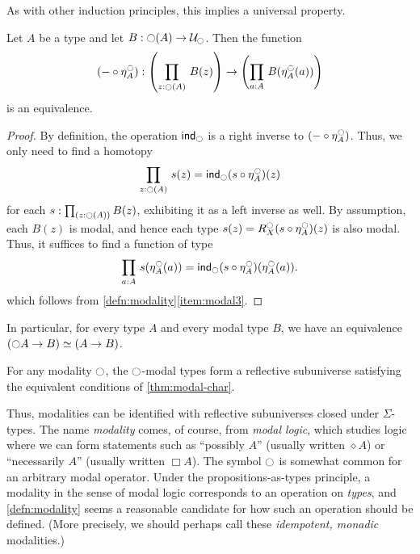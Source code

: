 As with other induction principles, this implies a universal property.

\begin{thm}\label{prop:lv_n_deptype_sec_equiv_by_precomp}
Let $A$ be a type and let $B:\ocircle(A)\to\mathcal{U}_{\ocircle}$. Then the function
\begin{equation*}
(-\circ \mreturn^\modal_A) : \left(\prd{z:\modal(A)}B(z)\right) \to \left(\prd{a:A}B(\mreturn^\modal_A(a))\right)
\end{equation*}
is an equivalence.
\end{thm}
\begin{proof}
By definition, the operation $\mathsf{ind}_{\ocircle}$ is a right inverse to $(-\circ \eta^{\ocircle}_A)$.
Thus, we only need to find a homotopy
\begin{equation*}
\prd{z:\modal(A)}s(z)= \ind{\modal}(s\circ \mreturn^\modal_A)(z)
\end{equation*}
for each $s:\prd{z:\modal(A)}B(z)$, exhibiting it as a left inverse as well.
By assumption, each $B(z)$ is modal, and hence each type $s(z)= R^{\ocircle}_X(s\circ \eta^{\ocircle}_A)(z)$
is also modal.
Thus, it suffices to find a function of type
\begin{equation*}
\prd{a:A}s(\mreturn^\modal_A(a))= \ind{\modal}(s\circ \mreturn^\modal_A)(\mreturn^\modal_A(a)).
\end{equation*}
which follows from \autoref{defn:modality}\ref{item:modal3}.
\end{proof}

In particular, for every type $A$ and every modal type $B$, we have an equivalence $(\ocircle A\to B)\simeq (A\to B)$.

\begin{cor}
  For any modality $\ocircle$, the $\ocircle$-modal types form a reflective subuniverse satisfying the equivalent conditions of \autoref{thm:modal-char}.
\end{cor}

Thus, modalities can be identified with reflective subuniverses closed under $\Sigma$-types.
The name \emph{modality} comes, of course, from \emph{modal logic}, which studies logic where we can form statements such as ``possibly $A$'' (usually written $\diamond A$) or ``necessarily $A$'' (usually written $\Box A$).
The symbol $\ocircle$ is somewhat common for an arbitrary modal operator. %
Under the propositions-as-types principle, a modality in the sense of modal logic corresponds to an operation on \emph{types}, and \autoref{defn:modality} seems a reasonable candidate for how such an operation should be defined.
(More precisely, we should perhaps call these \emph{idempotent, monadic} modalities.)

